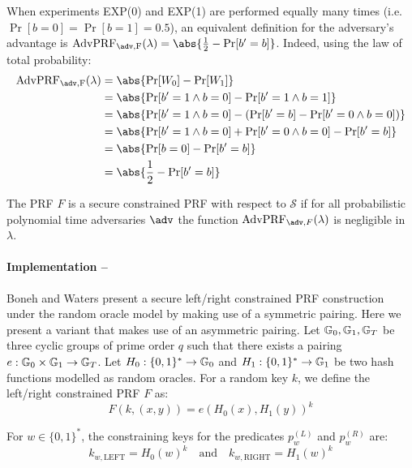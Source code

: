 		\noindent When experiments EXP(0) and EXP(1) are performed equally many times (i.e. $\Pr[b=0] = \Pr[b=1] = 0.5$), an equivalent definition for the adversary's advantage is $\mathrm{AdvPRF_{\adv, F}}(\lambda) = \abs{\frac{1}{2} - \Pr[b' = b]}$. Indeed, using the law of total probability:
		\begin{align}
				\mathrm{AdvPRF_{\adv, F}}(\lambda) &= \abs{\mathrm{Pr}[W_0] - \mathrm{Pr}[W_1]} \\
				&= \abs{\Pr[b' = 1 \land b=0] - \Pr[b' = 1 \land b=1]} \\
				&= \abs{\Pr[b' = 1 \land b=0] - \left(\Pr[b' = b] - \Pr[b' = 0 \land b=0] \right)} \\
				&= \abs{\Pr[b' = 1 \land b=0] + \Pr[b' = 0 \land b=0] - \Pr[b' = b]}\\
				&= \abs{\Pr[b=0]- \Pr[b' = b]} \\
				&= \abs{\frac{1}{2} - \Pr[b' = b]}
			\end{align}
		
		\begin{definition}
		\label{def:lrPRFsec}
			The PRF $F$ is a secure constrained PRF with respect to $\mathcal{S}$ if for all probabilistic
polynomial time adversaries $\adv$ the function $\mathrm{AdvPRF}_{\adv,F}(\lambda)$ is negligible in $\lambda$.
		\end{definition}


\paragraph{Implementation --} \label{leftright} Boneh and Waters \cite{LRPRF} present a secure left/right constrained PRF construction under the random oracle model by making use of a symmetric pairing. Here we present a variant that makes use of an asymmetric pairing. Let $\mathbb{G}_0, \mathbb{G}_1, \mathbb{G}_T$ be three cyclic groups of prime order $q$ such that there exists a pairing $e : \mathbb{G}_0 \times \mathbb{G}_1 \rightarrow \mathbb{G}_T$. Let $H_0: \{0,1\}^* \rightarrow \mathbb{G}_0$ and $H_1: \{0,1\}^* \rightarrow \mathbb{G}_1$ be two hash functions modelled as random oracles. For a random key $k$, we define the left/right constrained PRF $F$ as:
\begin{equation}
	\label{eq:LRPRF}
	F(k, (x,y)) = e(H_0(x), H_1(y))^k
\end{equation}

For $w \in \{0,1\}^*$, the constraining keys for the predicates $p_w^{(L)}$ and  $p_w^{(R)}$ are:
\begin{equation}
\label{eq:constrkeys}
	k_{w,\mathrm{LEFT}} = H_0(w)^k \quad \mathrm{and} \quad k_{w,\mathrm{RIGHT}} = H_1(w)^k
\end{equation}

